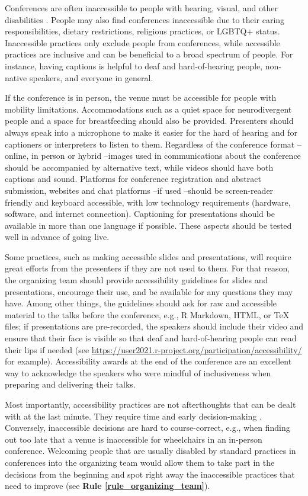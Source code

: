 \documentclass[10pt,letterpaper]{article}
\begin{document}
Conferences are often inaccessible to people with hearing, visual, and other disabilities \cite{price_access_2009}. People may also find conferences inaccessible due to their caring responsibilities, dietary restrictions, religious practices, or LGBTQ+ status.
Inaccessible practices only exclude people from conferences, while accessible practices are inclusive and can be beneficial to a broad spectrum of people. For instance, having captions is helpful to deaf and hard-of-hearing people, non-native speakers, and everyone in general. 

If the conference is in person, the venue must be accessible for people with mobility limitations. 
Accommodations such as a quiet space for neurodivergent people and a space for breastfeeding should also be provided.
Presenters should always speak into a microphone to make it easier for the hard of hearing and for captioners or interpreters to listen to them. 
Regardless of the conference format --online, in person or hybrid --images used in communications about the conference should be accompanied by alternative text, while videos should have both captions and sound. 
Platforms for conference registration and abstract submission, websites and chat platforms --if used --should be screen-reader friendly and keyboard accessible, with low technology requirements (hardware, software, and internet connection). 
Captioning for presentations should be available in more than one language if possible.
These aspects should be tested well in advance of going live.  

Some practices, such as making accessible slides and presentations, will require great efforts from the presenters if they are not used to them. 
For that reason, the organizing team should provide accessibility guidelines for slides and presentations, encourage their use, and be available for any questions they may have.  
Among other things, the guidelines should ask for raw and accessible material to the talks before the conference, e.g., R Markdown, HTML, or \TeX{} files; if presentations are pre-recorded, the speakers should include their video and ensure that their face is visible so that deaf and hard-of-hearing people can read their lips if needed (see \url{https://user2021.r-project.org/participation/accessibility/} for example). 
Accessibility awards at the end of the conference are an excellent way to acknowledge the speakers who were mindful of inclusiveness when preparing and delivering their talks. 

Most importantly, accessibility practices are not afterthoughts that can be dealt with at the last minute. 
They require time and early decision-making \cite{irish_increasing_2020}. 
Conversely, inaccessible decisions are hard to course-correct, e.g., when finding out too late that a venue is inaccessible for wheelchairs in an in-person conference. 
Welcoming people that are usually disabled by standard practices in conferences into the organizing team would allow them to take part in the decisions from the beginning and spot right away the inaccessible practices that need to improve (see \textbf{Rule \ref{rule_organizing_team}}). 
\end{document}
